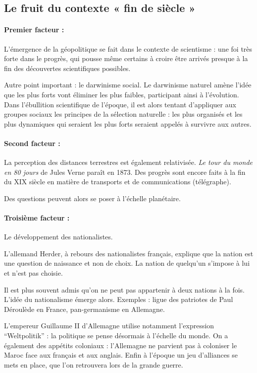 \documentclass[a4paper,10pt]{article}
\begin{document}
	\subsection{Le fruit du contexte « fin de siècle »}

		\paragraph{Premier facteur :}
		L'émergence de la géopolitique se fait dans le contexte de scientisme : une foi très forte dans le progrès, qui pousse même certains à croire être arrivés presque à la fin des découvertes scientifiques possibles.

		Autre point important : le darwinisme social.
		Le darwinisme naturel amène l'idée que les plus forts vont éliminer les plus faibles, participant ainsi à l'évolution.
		Dans l'ébullition scientifique de l'époque, il est alors tentant d'appliquer aux groupes sociaux les principes de la sélection naturelle : les plus organisés et les plus dynamiques qui seraient les plus forts seraient appelés à survivre aux autres.

		\paragraph{Second facteur :}
		La perception des distances terrestres est également relativisée. \emph{Le tour du monde en 80 jours} de Jules Verne paraît en 1873.
		Des progrès sont encore faits à la fin du XIX siècle en matière de transports et de communications (télégraphe).

		Des questions peuvent alors se poser à l'échelle planétaire.

		\paragraph{Troisième facteur :}
		Le développement des nationalistes.

		L'allemand Herder, à rebours des nationalistes français, explique que la nation est une question de naissance et non de choix. La nation de quelqu'un s'impose à lui et n'est pas choisie.

		Il est plus souvent admis qu'on ne peut pas appartenir à deux nations à la fois.
		L'idée du nationalisme émerge alors.
		Exemples : ligue des patriotes de Paul Déroulède en France, pan-germanisme en Allemagne.

		L'empereur Guillaume II d'Allemagne utilise notamment l'expression “Weltpolitik” : la politique se pense désormais à l'échelle du monde.
		On a également des appétits coloniaux : l'Allemagne ne parvient pas à coloniser le Maroc face aux français et aux anglais.
		Enfin à l'époque un jeu d'alliances se mets en place, que l'on retrouvera lors de la grande guerre.
\end{document}
